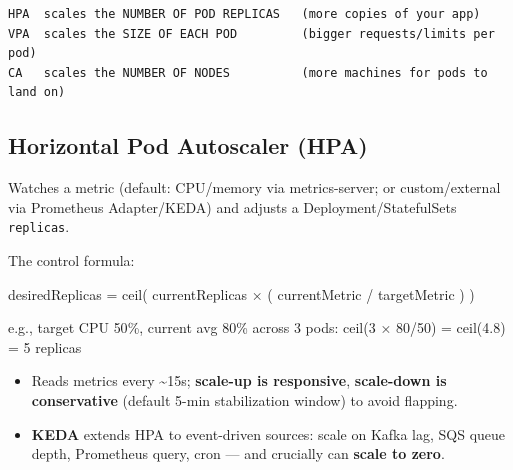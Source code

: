 \documentclass[11pt]{article}
\providecommand{\tightlist}{\setlength{\itemsep}{1pt}\setlength{\parskip}{0pt}}
\newenvironment{Shaded}{\begin{snugshade}}{\end{snugshade}}
\newcommand{\DecValTok}[1]{\textcolor[rgb]{0.96,0.45,0.00}{#1}}
\newcommand{\FloatTok}[1]{\textcolor[rgb]{0.96,0.45,0.00}{#1}}
\newcommand{\NormalTok}[1]{\textcolor[rgb]{0.81,0.81,0.76}{#1}}
\newcommand{\OperatorTok}[1]{\textcolor[rgb]{0.81,0.81,0.76}{#1}}
\begin{document}
\setcodelang{}

\begin{verbatim}
HPA  scales the NUMBER OF POD REPLICAS   (more copies of your app)
VPA  scales the SIZE OF EACH POD         (bigger requests/limits per pod)
CA   scales the NUMBER OF NODES          (more machines for pods to land on)
\end{verbatim}

\subsection{Horizontal Pod Autoscaler (HPA)}\label{horizontal-pod-autoscaler-hpa}

Watches a metric (default: CPU/memory via metrics-server; or custom/external via Prometheus Adapter/KEDA) and adjusts a Deployment/StatefulSet\textquotesingle s \texttt{replicas}.

The control formula:


\begin{Shaded}
\begin{Highlighting}[]
\NormalTok{desiredReplicas }\OperatorTok{=}\NormalTok{ ceil( currentReplicas × ( currentMetric }\OperatorTok{/}\NormalTok{ targetMetric ) )}

\NormalTok{e.g., target CPU }\DecValTok{50}\OperatorTok{\%}\NormalTok{, current avg }\DecValTok{80}\OperatorTok{\%}\NormalTok{ across }\DecValTok{3}\NormalTok{ pods:}
\NormalTok{      ceil(}\DecValTok{3}\NormalTok{ × }\DecValTok{80}\OperatorTok{/}\DecValTok{50}\NormalTok{) }\OperatorTok{=}\NormalTok{ ceil(}\FloatTok{4.8}\NormalTok{) }\OperatorTok{=} \DecValTok{5}\NormalTok{ replicas}
\end{Highlighting}
\end{Shaded}

\begin{itemize}
\tightlist
\item
  Reads metrics every \textasciitilde15s; \textbf{scale-up is responsive}, \textbf{scale-down is conservative} (default 5-min stabilization window) to avoid flapping.
\item
  \textbf{KEDA} extends HPA to event-driven sources: scale on Kafka lag, SQS queue depth, Prometheus query, cron --- and crucially can \textbf{scale to zero}.
\end{itemize}

\end{document}
